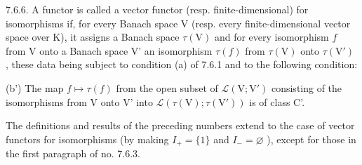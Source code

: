 7.6.6. A functor is called a vector functor (resp. finite-dimensional) for isomorphisms if, for every Banach space V (resp. every finite-dimensional vector space over K), it assigns a Banach space \(\tau(\mathrm{V})\) and for every isomorphism \(f\) from V onto a Banach space V' an isomorphism \(\tau(f)\) from \(\tau(\mathrm{V})\) onto \(\tau(\mathrm{V}')\) , these data being subject to condition (a) of 7.6.1 and to the following condition:

(b') The map \(f\mapsto\tau(f)\) from the open subset of \(\mathcal{L}(\mathrm{V};\mathrm{V}')\) consisting of the isomorphisms from V onto V' into \(\mathcal{L}(\tau(\mathrm{V});\tau(\mathrm{V}'))\) is of class C'.

The definitions and results of the preceding numbers extend to the case of vector functors for isomorphisms (by making \(I_{+} = \{1\}\) and \(I_{-} = \varnothing\) ), except for those in the first paragraph of no. 7.6.3.

